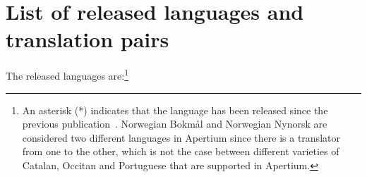 \documentclass[free]{flammie}
\begin{document}


\clearpage
\appendix

\section{List of released languages and translation pairs}\label{app:translationPairs}

The released languages are:\footnote{An asterisk (*) indicates that the language
has been released since the previous publication~\cite{forcada2011apertium}.
Norwegian Bokmål and Norwegian Nynorsk are considered two different languages in
Apertium since there is a translator from one to the other, which is not the
case between different varieties of Catalan, Occitan and Portuguese that are
supported in Apertium.}
\end{document}
